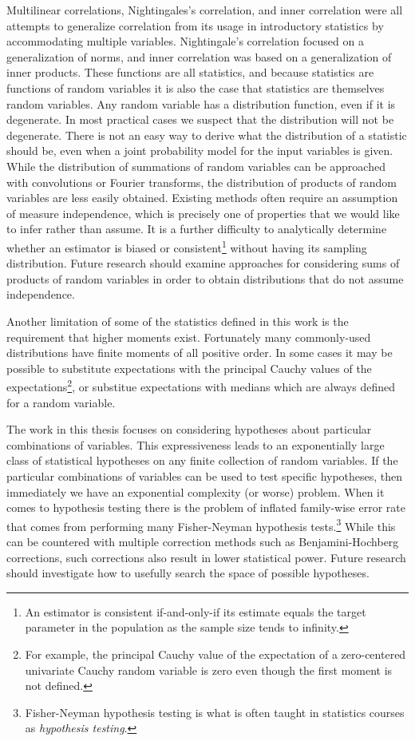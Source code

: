 \documentclass[
  letterpaper,
  DIV=11,
  numbers=noendperiod]{scrreprt}
\begin{document}
Multilinear correlations, Nightingales's correlation, and inner
correlation were all attempts to generalize correlation from its usage
in introductory statistics by accommodating multiple variables.
Nightingale's correlation focused on a generalization of norms, and
inner correlation was based on a generalization of inner products. These
functions are all statistics, and because statistics are functions of
random variables it is also the case that statistics are themselves
random variables. Any random variable has a distribution function, even
if it is degenerate. In most practical cases we suspect that the
distribution will not be degenerate. There is not an easy way to derive
what the distribution of a statistic should be, even when a joint
probability model for the input variables is given. While the
distribution of summations of random variables can be approached with
convolutions or Fourier transforms, the distribution of products of
random variables are less easily obtained. Existing methods often
require an assumption of measure independence, which is precisely one of
properties that we would like to infer rather than assume. It is a
further difficulty to analytically determine whether an estimator is
biased or
consistent\footnote{An estimator is consistent if-and-only-if its estimate equals the target parameter in the population as the sample size tends to infinity.}
without having its sampling distribution. Future research should examine
approaches for considering sums of products of random variables in order
to obtain distributions that do not assume independence.

Another limitation of some of the statistics defined in this work is the
requirement that higher moments exist. Fortunately many commonly-used
distributions have finite moments of all positive order. In some cases
it may be possible to substitute expectations with the principal Cauchy
values of the
expectations\footnote{For example, the principal Cauchy value of the expectation of a zero-centered univariate Cauchy random variable is zero even though the first moment is not defined.},
or substitue expectations with medians which are always defined for a
random variable.

The work in this thesis focuses on considering hypotheses about
particular combinations of variables. This expressiveness leads to an
exponentially large class of statistical hypotheses on any finite
collection of random variables. If the particular combinations of
variables can be used to test specific hypotheses, then immediately we
have an exponential complexity (or worse) problem. When it comes to
hypothesis testing there is the problem of inflated family-wise error
rate that comes from performing many Fisher-Neyman hypothesis
tests.\footnote{Fisher-Neyman hypothesis testing is what is often taught in statistics courses as \textit{hypothesis testing}.}
While this can be countered with multiple correction methods such as
Benjamini-Hochberg corrections, such corrections also result in lower
statistical power. Future research should investigate how to usefully
search the space of possible hypotheses.
\end{document}
